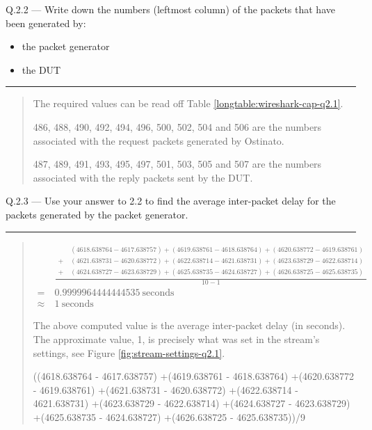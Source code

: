 \documentclass{article}
\newcommand\Que[2]{%
\begin{samepage}
\leavevmode\par
\noindent
Q.#1 --- #2\par\vspace{10pt}\hrule\vspace{10pt}
\end{samepage}}
\newenvironment{ans}
{\fbox{Answer}\begin{quote}\nopagebreak}
{\end{quote}}
\begin{document}
\newpage

\Que{2.2}{Write down the numbers (leftmost column) of the packets that have been generated by:
\begin{itemize}
\item the packet generator
\item the DUT
\end{itemize}
}

\begin{ans}
The required values can be read off Table
\ref{longtable:wireshark-cap-q2.1}.

486, 488, 490, 492, 494, 496, 500, 502, 504 and 506 are the
numbers associated with the request packets generated by
Ostinato.

487, 489, 491, 493, 495, 497, 501, 503, 505 and 507 are the
numbers associated with the reply packets sent by the DUT.
\end{ans}

\Que{2.3}{Use your answer to 2.2 to find the average
inter-packet delay for the packets generated by the packet
generator.}
\begin{ans}

$$
\begin{aligned}
          & \frac{
\begin{aligned}
    & (4618.638764 - 4617.638757)
+(4619.638761 - 4618.638764)
+(4620.638772 - 4619.638761)      \\
+\  & (4621.638731 - 4620.638772)
+(4622.638714 - 4621.638731)
+(4623.638729 - 4622.638714)      \\
+\  & (4624.638727 - 4623.638729)
+(4625.638735 - 4624.638727)
+(4626.638725 - 4625.638735)
\end{aligned}
}{10 - 1}                                      \\
=\        & 0.9999964444444535\ \text{seconds} \\
\approx\  & 1\ \text{seconds}
\end{aligned}
$$

The above computed value is the average inter-packet delay
(in seconds). The approximate value, 1, is precisely what
was set in the stream's settings, see Figure
\ref{fig:stream-settings-q2.1}.

\begin{gruvboxlisting}[language=Python, caption={Python
expression for calculating the inter-packet delay for
Question 2.3.}]
((4618.638764 - 4617.638757)
+(4619.638761 - 4618.638764)
+(4620.638772 - 4619.638761)
+(4621.638731 - 4620.638772)
+(4622.638714 - 4621.638731)
+(4623.638729 - 4622.638714)
+(4624.638727 - 4623.638729)
+(4625.638735 - 4624.638727)
+(4626.638725 - 4625.638735))/9
\end{gruvboxlisting}

\end{ans}
\end{document}
